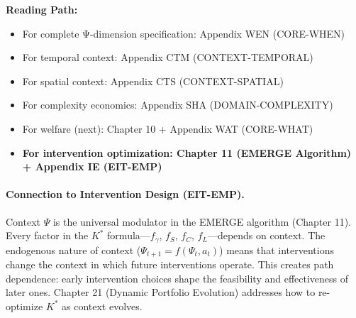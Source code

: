 \begin{cross-reference}
\textbf{Reading Path:}
\begin{itemize}
    \item For complete Ψ-dimension specification: Appendix WEN (CORE-WHEN)
    \item For temporal context: Appendix CTM (CONTEXT-TEMPORAL)
    \item For spatial context: Appendix CTS (CONTEXT-SPATIAL)
    \item For complexity economics: Appendix SHA (DOMAIN-COMPLEXITY)
    \item For welfare (next): Chapter 10 + Appendix WAT (CORE-WHAT)
    \item \textbf{For intervention optimization: Chapter 11 (EMERGE Algorithm) + Appendix IE (EIT-EMP)}
\end{itemize}
\end{cross-reference}

\paragraph{Connection to Intervention Design (EIT-EMP).}
Context $\Psi$ is the universal modulator in the EMERGE algorithm (Chapter 11). Every
factor in the $K^*$ formula---$f_\gamma$, $f_S$, $f_C$, $f_L$---depends on context.
The endogenous nature of context ($\Psi_{t+1} = f(\Psi_t, a_t)$) means that interventions
change the context in which future interventions operate. This creates path dependence:
early intervention choices shape the feasibility and effectiveness of later ones. Chapter 21
(Dynamic Portfolio Evolution) addresses how to re-optimize $K^*$ as context evolves.

